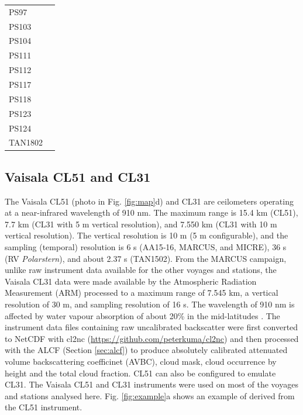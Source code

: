 \documentclass[12pt,a4paper]{article}
\begin{document}
\begin{table}[t!]
\begin{tabular}{lp{14.5cm}}
PS97     & \cite{kniglanglo2016f,kniglanglo2016g,kniglanglo2016h,kniglanglo2016i,lamy2017} \\
PS103    & \cite{kniglanglo2017a,kniglanglo2017b,kniglanglo2017c,kniglanglo2017d,boebel2018} \\
PS104    & \cite{kniglanglo2017e,kniglanglo2017f,kniglanglo2017g,gohl2018,schmithsen2021a} \\
PS111    & \cite{schmithsen2019a,schmithsen2020a,schmithsen2021b,schmithsen2021c,schrder2018} \\
PS112    & \cite{schmithsen2019b,schmithsen2020b,schmithsen2021d,schmithsen2021e,meyer2018} \\
PS117    & \cite{schmithsen2019c,schmithsen2020c,schmithsen2021f,schmithsen2021g,boebel2019} \\
PS118    & \cite{schmithsen2019d,schmithsen2020d,schmithsen2021h,schmithsen2021i,dorschel2019} \\
PS123    & \cite{schmithsen2021j,schmithsen2021m,schmithsen2021n,schmithsen2021k,hoppmann2023} \\
PS124    & \cite{schmithsen2021o,schmithsen2021q,schmithsen2021p,hoppmann2023} \\
TAN1802  & \cite{kremser2020,kremser2021} \\
\end{tabular}
\end{table}

\subsection{Vaisala CL51 and CL31}
\label{sec:cl51}

The Vaisala CL51 (photo in Fig. \ref{fig:map}d) and CL31 are ceilometers
operating at a near-infrared wavelength of 910 nm. The maximum range is 15.4 km
(CL51), 7.7 km (CL31 with 5 m vertical resolution), and 7.550 km (CL31 with 10
m vertical resolution). The vertical resolution is 10 m (5 m configurable), and
the sampling (temporal) resolution is 6 s (AA15‐16, MARCUS, and MICRE), 36 s (RV
\emph{Polarstern}), and about 2.37 s (TAN1502). From the MARCUS campaign, unlike raw
instrument data available for the other voyages and stations, the Vaisala CL31
data were made available by the Atmospheric Radiation Measurement (ARM)
processed to a maximum range of 7.545 km, a vertical resolution of 30 m, and
sampling resolution of 16 s. The wavelength of 910 nm is affected by water
vapour absorption of about 20\% in the mid-latitudes
\citep{wiegner2015,wiegner2019}.  The instrument data files containing raw
uncalibrated backscatter were first converted to NetCDF with cl2nc
(\url{https://github.com/peterkuma/cl2nc}) and then processed with the ALCF
(Section \ref{sec:alcf}) to produce absolutely calibrated attenuated volume
backscattering coefficinet (AVBC), cloud mask, cloud occurrence by height and
the total cloud fraction. CL51 can also be configured to emulate CL31. The
Vaisala CL51 and CL31 instruments were used on most of the voyages and stations
analysed here. Fig. \ref{fig:example}a shows an example of derived from the
CL51 instrument.
\end{document}
